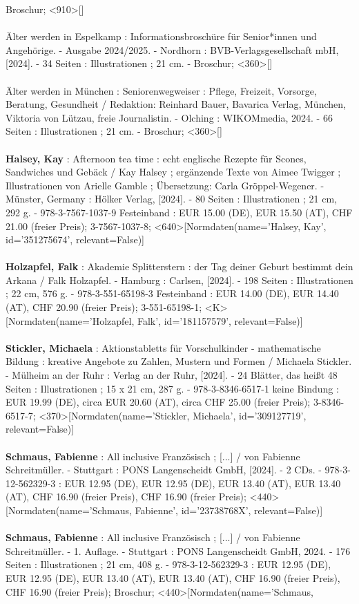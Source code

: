 \documentclass{article}
\begin{document}
\begin{multicols}{3}
Broschur; <910>[]\\\\Älter werden in Espelkamp : Informationsbroschüre für Senior*innen und Angehörige. - Ausgabe 2024/2025. - Nordhorn : BVB-Verlagsgesellschaft mbH, [2024]. - 34 Seiten : Illustrationen ; 21 cm. - Broschur; <360>[]\\\\Älter werden in München : Seniorenwegweiser : Pflege, Freizeit, Vorsorge, Beratung, Gesundheit / Redaktion:  Reinhard Bauer, Bavarica Verlag, München, Viktoria von Lützau, freie Journalistin. - Olching : WIKOMmedia, 2024. - 66 Seiten : Illustrationen ; 21 cm. - Broschur; <360>[]\\\\\textbf{Halsey, Kay} : Afternoon tea time : echt englische Rezepte für Scones, Sandwiches und Gebäck / Kay Halsey ; ergänzende Texte von Aimee Twigger ; Illustrationen von Arielle Gamble ; Übersetzung: Carla Gröppel-Wegener. - Münster, Germany : Hölker Verlag, [2024]. - 80 Seiten : Illustrationen ; 21 cm, 292 g. - 978-3-7567-1037-9 Festeinband : EUR 15.00 (DE), EUR 15.50 (AT), CHF 21.00 (freier Preis); 3-7567-1037-8; <640>[Normdaten(name='Halsey, Kay', id='351275674', relevant=False)]\\\\\textbf{Holzapfel, Falk} : Akademie Splitterstern : der Tag deiner Geburt bestimmt dein Arkana / Falk Holzapfel. - Hamburg : Carlsen, [2024]. - 198 Seiten : Illustrationen ; 22 cm, 576 g. - 978-3-551-65198-3 Festeinband : EUR 14.00 (DE), EUR 14.40 (AT), CHF 20.90 (freier Preis); 3-551-65198-1; <K>[Normdaten(name='Holzapfel, Falk', id='181157579', relevant=False)]\\\\\textbf{Stickler, Michaela} : Aktionstabletts für Vorschulkinder - mathematische Bildung : kreative Angebote zu Zahlen, Mustern und Formen / Michaela Stickler. - Mülheim an der Ruhr : Verlag an der Ruhr, [2024]. - 24 Blätter, das heißt 48 Seiten : Illustrationen ; 15 x 21 cm, 287 g. - 978-3-8346-6517-1 keine Bindung : EUR 19.99 (DE), circa EUR 20.60 (AT), circa CHF 25.00 (freier Preis); 3-8346-6517-7; <370>[Normdaten(name='Stickler, Michaela', id='309127719', relevant=False)]\\\\\textbf{Schmaus, Fabienne} : All inclusive Französisch ; [...] / von Fabienne Schreitmüller. - Stuttgart : PONS Langenscheidt GmbH, [2024]. - 2 CDs. - 978-3-12-562329-3 : EUR 12.95 (DE), EUR 12.95 (DE), EUR 13.40 (AT), EUR 13.40 (AT), CHF 16.90 (freier Preis), CHF 16.90 (freier Preis); <440>[Normdaten(name='Schmaus, Fabienne', id='23738768X', relevant=False)]\\\\\textbf{Schmaus, Fabienne} : All inclusive Französisch ; [...] / von Fabienne Schreitmüller. - 1. Auflage. - Stuttgart : PONS Langenscheidt GmbH, 2024. - 176 Seiten : Illustrationen ; 21 cm, 408 g. - 978-3-12-562329-3 : EUR 12.95 (DE), EUR 12.95 (DE), EUR 13.40 (AT), EUR 13.40 (AT), CHF 16.90 (freier Preis), CHF 16.90 (freier Preis); Broschur; <440>[Normdaten(name='Schmaus, 
\end{multicols}
\end{document}
